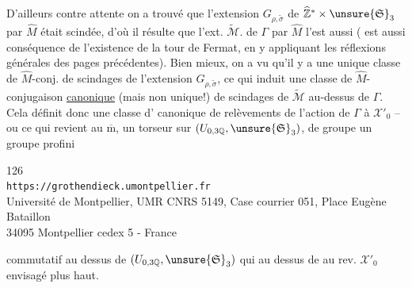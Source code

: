 D'ailleurs contre  attente on a trouvé que l'extension $G_{\rho,\widetilde\sigma}$ de $\widehat{\mathbb Z}^{*}\times\unsure{\mathfrak S}_3$ par $\widehat M$ était scindée, d'où il résulte que  l'ext. $\widetilde{\mathcal M}$. de $\Gamma$ par $\widehat M$ l'est aussi (  est aussi conséquence de l'existence de la tour de Fermat, en y appliquant les réflexions générales des pages précédentes). Bien mieux, on a vu qu'il y a une unique classe de $\widehat M$-conj. de scindages de l'extension $G_{\rho,\widetilde\sigma}$, ce qui induit une classe de $\widehat M$-conjugaison \uline{canonique} (mais non unique!) de  scindages de $\widetilde{\mathcal M}$ au-dessus de $\Gamma$. Cela définit donc une classe d' canonique de relèvements de l'action de $\Gamma$  à $\mathcal X'_0$ -- ou ce qui revient au $\overline{\mathrm m}$, un torseur sur $(U_{0,3\mathbb Q},\unsure{\mathfrak S}_3)$, de groupe un groupe profini



\begin{center}
\small
126\\
\texttt{https://grothendieck.umontpellier.fr}\\
Université de Montpellier, UMR CNRS 5149, Case courrier 051, Place Eugène Bataillon\\
34095 Montpellier cedex 5 - France
\end{center}


commutatif au dessus de $(U_{0,3\mathbb Q},\unsure{\mathfrak S}_3)$ qui au dessus de   au rev. $\mathcal X'_0$ envisagé plus haut.

